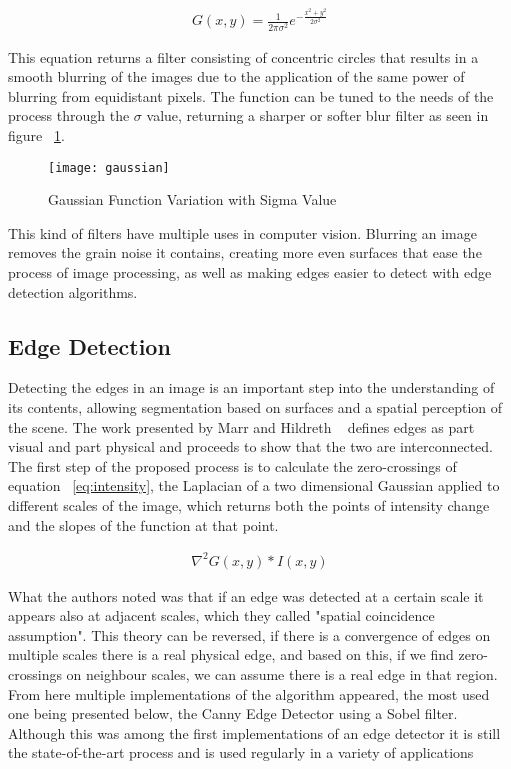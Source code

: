 \begin{eqnarray}
\label{eq:gaussian}
G(x,y) = \frac{1}{2\pi \sigma ^{2}}e^{-\frac{x^{2}+y^{2}}{2\sigma ^{2}}}
\end{eqnarray}

This equation returns a filter consisting of concentric circles that results in a smooth blurring of the images due to the application of the same power of blurring from equidistant pixels. The function can be tuned to the needs of the process through the $\sigma$ value, returning a sharper or softer blur filter as seen in figure ~\ref{fig:gaussian}.

\begin{figure}[h]
  \begin{center}
    \leavevmode
    \texttt{[image: gaussian]}
    \caption{Gaussian Function Variation with Sigma Value}
    \label{fig:gaussian}
  \end{center}
\end{figure}

This kind of filters have multiple uses in computer vision. Blurring an image removes the grain noise it contains, creating more even surfaces that ease the process of image processing, as well as making edges easier to detect with edge detection algorithms.

\subsection{Edge Detection}

Detecting the edges in an image is an important step into the understanding of its contents, allowing segmentation based on surfaces and a spatial perception of the scene. The work presented by Marr and Hildreth ~\cite{Marr1980TheoryOE} defines edges as part visual and part physical and proceeds to show that the two are interconnected. The first step of the proposed process is to calculate the zero-crossings of equation ~\ref{eq:intensity}, the Laplacian of a two dimensional Gaussian applied to different scales of the image, which returns both the points of intensity change and the slopes of the function at that point.

\begin{eqnarray}
\label{eq:intensity}
\nabla^{2} G(x,y)*I(x,y)
\end{eqnarray}

What the authors noted was that if an edge was detected at a certain scale it appears also at adjacent scales, which they called "spatial coincidence assumption". This theory can be reversed, if there is a convergence of edges on multiple scales there is a real physical edge, and based on this, if we find zero-crossings on neighbour scales, we can assume there is a real edge in that region. From here multiple implementations of the algorithm appeared, the most used one being presented below, the Canny Edge Detector using a Sobel filter. Although this was among the first implementations of an edge detector it is still the state-of-the-art process and is used regularly in a variety of applications

